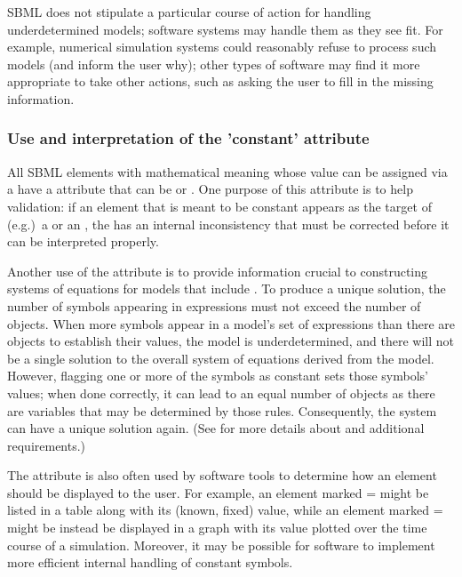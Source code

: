 \begin{blockRelChange}
SBML \thisLV does not stipulate a particular course of action for handling underdetermined models; software systems may handle them as they see fit.  For example, numerical simulation systems could reasonably refuse to process such models (and inform the user why); other types of software may find it more appropriate to take other actions, such as asking the user to fill in the missing information.

\subsubsection{Use and interpretation of the 'constant' attribute}
\label{sec:constant-flag}

All SBML elements with mathematical meaning whose value can be assigned via a \Rule have a  attribute that can be  or .  One purpose of this attribute is to help validation: if an element that is meant to be constant appears as the target of (e.g.)\ a \RateRule or an \AssignmentRule, the \Model has an internal inconsistency that must be corrected before it can be interpreted properly.

Another use of the  attribute is to provide information crucial to constructing systems of equations for models that include \AlgebraicRule.  To produce a unique solution, the number of symbols appearing in \AlgebraicRule {} expressions must not exceed the number of \AlgebraicRule objects.  When more symbols appear in a model's set of \AlgebraicRule {} expressions than there are \AlgebraicRule objects to establish their values, the model is underdetermined, and there will not be a single solution to the overall system of equations derived from the model.  However, flagging one or more of the symbols as constant sets those symbols' values; when done correctly, it can lead to an equal number of \AlgebraicRule objects as there are variables that may be determined by those rules.  Consequently, the system can have a unique solution again.  (See  for more details about \AlgebraicRule and additional requirements.)

The  attribute is also often used by software tools to determine how an element should be displayed to the user.  For example, an element marked = might be listed in a table along with its (known, fixed) value, while an element marked = might be instead be displayed in a graph with its value plotted over the time course of a simulation.  Moreover, it may be possible for software to implement more efficient internal handling of constant symbols.

\end{blockRelChange}



